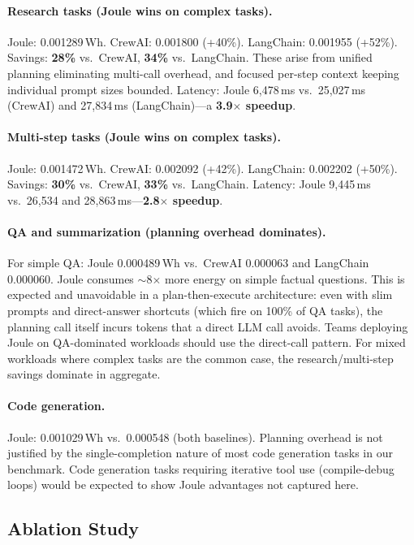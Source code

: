 \documentclass[sigconf,authordraft]{acmart}
\begin{document}
\paragraph{Research tasks (Joule wins on complex tasks).}
Joule: 0.001289\,Wh.
CrewAI: 0.001800 (+40\%). LangChain: 0.001955 (+52\%).
Savings: \textbf{28\%} vs.\ CrewAI, \textbf{34\%} vs.\ LangChain.
These arise from unified planning eliminating multi-call overhead, and focused per-step context keeping individual prompt sizes bounded.
Latency: Joule 6,478\,ms vs.\ 25,027\,ms (CrewAI) and 27,834\,ms (LangChain)---a \textbf{3.9$\times$ speedup}.

\paragraph{Multi-step tasks (Joule wins on complex tasks).}
Joule: 0.001472\,Wh.
CrewAI: 0.002092 (+42\%). LangChain: 0.002202 (+50\%).
Savings: \textbf{30\%} vs.\ CrewAI, \textbf{33\%} vs.\ LangChain.
Latency: Joule 9,445\,ms vs.\ 26,534 and 28,863\,ms---\textbf{2.8$\times$ speedup}.

\paragraph{QA and summarization (planning overhead dominates).}
For simple QA: Joule 0.000489\,Wh vs.\ CrewAI 0.000063 and LangChain 0.000060.
Joule consumes $\sim$8$\times$ more energy on simple factual questions.
This is expected and unavoidable in a plan-then-execute architecture: even with slim prompts and direct-answer shortcuts (which fire on 100\% of QA tasks), the planning call itself incurs tokens that a direct LLM call avoids.
Teams deploying Joule on QA-dominated workloads should use the direct-call pattern.
For mixed workloads where complex tasks are the common case, the research/multi-step savings dominate in aggregate.

\paragraph{Code generation.}
Joule: 0.001029\,Wh vs.\ 0.000548 (both baselines).
Planning overhead is not justified by the single-completion nature of most code generation tasks in our benchmark.
Code generation tasks requiring iterative tool use (compile-debug loops) would be expected to show Joule advantages not captured here.

\subsection{Ablation Study}
\label{sec:ablation}
\end{document}

